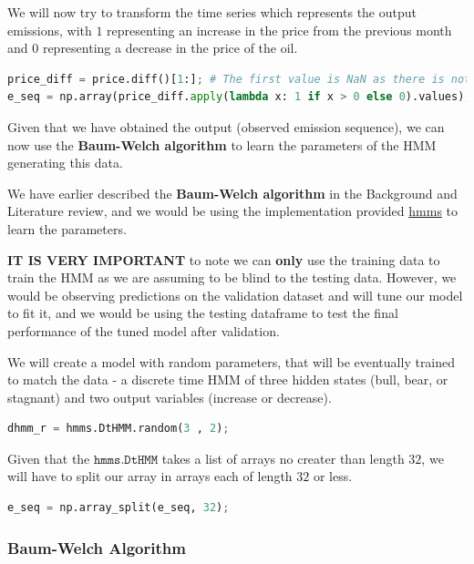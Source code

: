 We will now try to transform the time series which represents the output
emissions, with \(1\) representing an increase in the price from the
previous month and \(0\) representing a decrease in the price of the
oil.

\begin{lstlisting}[language=Python]
price_diff = price.diff()[1:]; # The first value is NaN as there is not a previous month to compare with
e_seq = np.array(price_diff.apply(lambda x: 1 if x > 0 else 0).values); # Replacing the change with 1 if positive, else 0
\end{lstlisting}

Given that we have obtained the output (observed emission sequence), we
can now use the \textbf{Baum-Welch algorithm} to learn the parameters of
the HMM generating this data.

We have earlier described the \textbf{Baum-Welch algorithm} in the
Background and Literature review, and we would be using the
implementation provided \href{https://github.com/lopatovsky/HMMs}{hmms}
to learn the parameters.

\textbf{IT IS VERY IMPORTANT} to note we can \textbf{only} use the
training data to train the HMM as we are assuming to be blind to the
testing data. However, we would be observing predictions on the
validation dataset and will tune our model to fit it, and we would be
using the testing dataframe to test the final performance of the tuned
model after validation.

We will create a model with random parameters, that will be eventually
trained to match the data - a discrete time HMM of three hidden states
(bull, bear, or stagnant) and two output variables (increase or
decrease).

\begin{lstlisting}[language=Python]
dhmm_r = hmms.DtHMM.random(3 , 2); 
\end{lstlisting}

Given that the \(\texttt{hmms.DtHMM}\) takes a list of arrays no creater
than length \(32\), we will have to split our array in arrays each of
length \(32\) or less.

\begin{lstlisting}[language=Python]
e_seq = np.array_split(e_seq, 32);
\end{lstlisting}

\hypertarget{baum-welch-algorithm}{%
\subsubsection{Baum-Welch Algorithm}\label{baum-welch-algorithm}}

